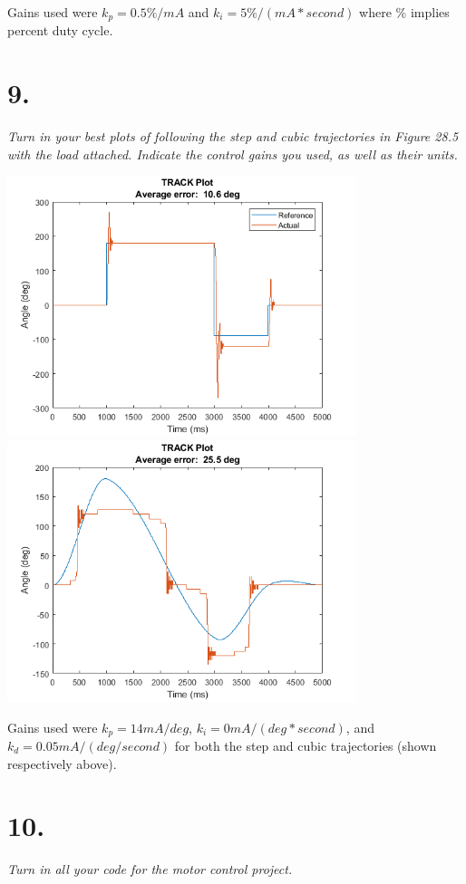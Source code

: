 \documentclass[12pt]{article}
\begin{document}
Gains used were $k_p = 0.5 \%/mA$ and $k_i = 5 \%/(mA*second)$ where $\%$ implies percent duty cycle.

\section*{9.}
\textit{Turn in your best plots of following the step and cubic trajectories in Figure 28.5 with the load attached. Indicate the control gains you used, as well as their units.}

\begin{center}
    \includegraphics[width=4in]{step_kp14_ki0_kd0.05.png}
    \includegraphics[width=4in]{cubic_kp14_ki0_kd0.05.png}
\end{center}

Gains used were $k_p = 14 mA/deg$, $k_i = 0 mA/(deg*second)$, and $k_d = 0.05 mA/(deg/second)$ for both the step and cubic trajectories (shown respectively above).

\section*{10.}
\textit{Turn in all your code for the motor control project.}
\end{document}

